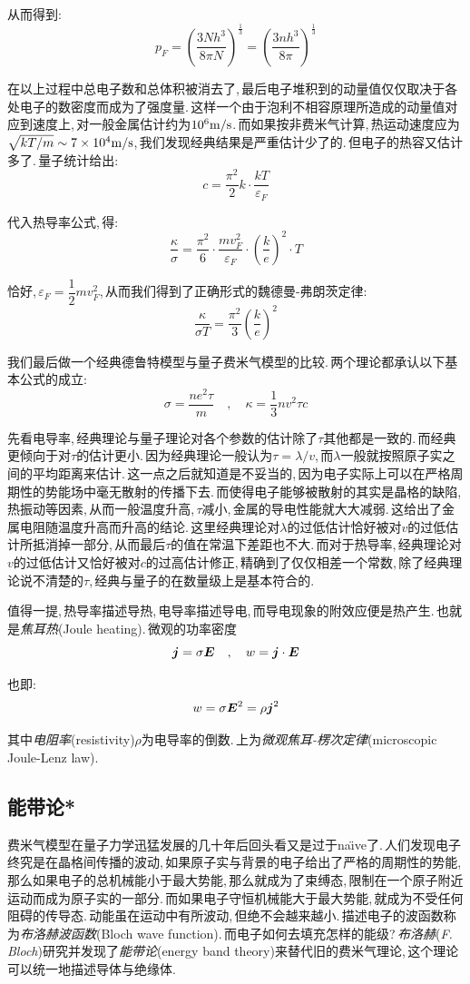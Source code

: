 从而得到:
\[p_F=\left(\frac{3Nh^3}{8\pi N}\right)^{\frac{1}{3}}=\left(\frac{3nh^3}{8\pi}\right)^{\frac{1}{3}}\]

在以上过程中总电子数和总体积被消去了,\,最后电子堆积到的动量值仅仅取决于各处电子的数密度而成为了强度量.\,这样一个由于泡利不相容原理所造成的动量值对应到速度上,\,对一般金属估计约为$10^6\rm m/s$.\,而如果按非费米气计算,\,热运动速度应为$\sqrt{kT/m}\sim 7\times 10^{4}\rm m/s$,\,我们发现经典结果是严重估计少了的.\,但电子的热容又估计多了.\,量子统计给出:
\[c=\frac{\pi^2}{2}k\cdot\frac{kT}{\varepsilon_F}\]

代入热导率公式,\,得:
\[\frac{\kappa}{\sigma}=\frac{\pi^2}{6}\cdot\frac{mv_F^2}{\varepsilon_F}\cdot\left(\frac{k}{e}\right)^2\cdot T\]

恰好,\,$\varepsilon_F=\dfrac{1}{2}mv_F^2$,\,从而我们得到了正确形式的魏德曼-弗朗茨定律:
\[\frac{\kappa}{\sigma T}=\frac{\pi^2}{3}\left(\frac{k}{e}\right)^2\]

我们最后做一个经典德鲁特模型与量子费米气模型的比较.\,两个理论都承认以下基本公式的成立:
\[\sigma=\frac{ne^2 \tau}{m}\quad ,\quad \kappa=\frac{1}{3}nv^2\tau c\]

先看电导率,\,经典理论与量子理论对各个参数的估计除了$\tau$其他都是一致的.\,而经典更倾向于对$\tau$的估计更小.\,因为经典理论一般认为$\tau=\lambda/v$,\,而$\lambda$一般就按照原子实之间的平均距离来估计.\,这一点之后就知道是不妥当的,\,因为电子实际上可以在严格周期性的势能场中毫无散射的传播下去.\,而使得电子能够被散射的其实是晶格的缺陷,\,热振动等因素,\,从而一般温度升高,\,$\tau$减小,\,金属的导电性能就大大减弱.\,这给出了金属电阻随温度升高而升高的结论.\,这里经典理论对$\lambda$的过低估计恰好被对$v$的过低估计所抵消掉一部分,\,从而最后$\tau$的值在常温下差距也不大.\,而对于热导率,\,经典理论对$v$的过低估计又恰好被对$c$的过高估计修正,\,精确到了仅仅相差一个常数,\,除了经典理论说不清楚的$\tau$,\,经典与量子的在数量级上是基本符合的.

值得一提,\,热导率描述导热,\,电导率描述导电,\,而导电现象的附效应便是热产生.\,也就是\emph{焦耳热}(Joule heating).\,微观的功率密度
\[\boldsymbol{j}=\sigma \boldsymbol{E}\quad ,\quad w=\boldsymbol{j}\cdot\boldsymbol{E}\]

也即:
\[w=\sigma \boldsymbol{E}^2=\rho \boldsymbol{j}^2\]

其中\emph{电阻率}(resistivity)$\rho$为电导率的倒数.\,上为\emph{微观焦耳-楞次定律}(microscopic Joule-Lenz law).

\subsection{能带论*}

费米气模型在量子力学迅猛发展的几十年后回头看又是过于na\"\i ve了.\,人们发现电子终究是在晶格间传播的波动,\,如果原子实与背景的电子给出了严格的周期性的势能,\,那么如果电子的总机械能小于最大势能,\,那么就成为了束缚态,\,限制在一个原子附近运动而成为原子实的一部分.\,而如果电子守恒机械能大于最大势能,\,就成为不受任何阻碍的传导态.\,动能虽在运动中有所波动,\,但绝不会越来越小.\,描述电子的波函数称为\emph{布洛赫波函数}(Bloch wave function).\,而电子如何去填充怎样的能级?\,\emph{布洛赫}({\it F. Bloch})研究并发现了\emph{能带论}(energy band theory)来替代旧的费米气理论,\,这个理论可以统一地描述导体与绝缘体.

